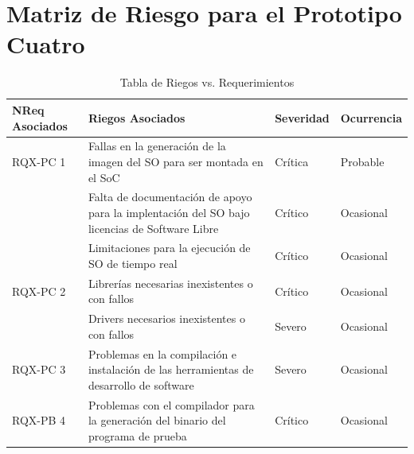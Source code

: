 		
		\section{Matriz de Riesgo para el Prototipo Cuatro} 

		\begin{table}[h!]
		\centering
		\begin{tabular}{ p{2.5cm} p{9cm} p{2cm} p{2cm} }
		\hline 
		\rowcolor[gray]{0.8} N\textordmasculine Req Asociados  & Riegos Asociados & Severidad  & Ocurrencia \\
		\hline RQX-PC 1 & Fallas en la generación de la imagen del SO para ser montada en el SoC & Crítica       & Probable \\
		\hline			& Falta de documentación de apoyo para la implentación del SO bajo licencias de Software Libre & Crítico & Ocasional\\	
		\hline			& Limitaciones para la ejecución de SO de tiempo real & Crítico & Ocasional\\	
 		\hline RQX-PC 2 & Librerías necesarias inexistentes o con fallos& Crítico & Ocasional\\	
		\hline			& Drivers necesarios inexistentes o con fallos  & Severo  &  Ocasional\\ 
		\hline RQX-PC 3	& Problemas en la compilación e instalación de las herramientas de desarrollo de software& Severo  &  Ocasional\\ 
		\hline RQX-PB 4 & Problemas con el compilador para la generación del binario del programa de prueba  & Crítico&  Ocasional\\
		\hline
		\end{tabular}
		\caption{Tabla de Riegos vs. Requerimientos}
		\end{table}

		\newpage


